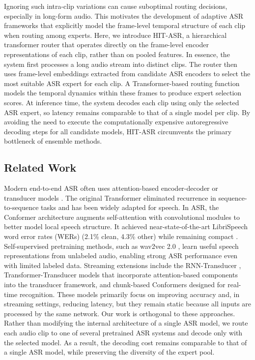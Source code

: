 \documentclass[journal]{IEEEtran}
\begin{document}
Ignoring such intra-clip variations can  cause suboptimal routing decisions, especially in long-form audio. This motivates the development of adaptive ASR frameworks that explicitly model the frame-level temporal structure of each clip when routing among experts. Here, we introduce HIT-ASR, a hierarchical transformer router that operates directly on the frame-level encoder representations of each clip, rather than on pooled features. In essence, the system first processes a long audio stream into distinct clips. The router then uses frame-level embeddings extracted from candidate ASR encoders to select the most suitable ASR expert for each clip. A Transformer-based routing function models the temporal dynamics within these frames to produce expert selection scores. At inference time, the system decodes each clip using only the selected ASR expert, so latency remains comparable to that of a single model per clip. By avoiding the need to execute the computationally expensive autoregressive decoding steps for all candidate models, HIT-ASR circumvents the primary bottleneck of ensemble methods.

 
\subsection{Related Work}
\label{sec:related_work}

Modern end-to-end ASR often uses attention-based encoder-decoder or transducer models \cite{deng_conf}. The original Transformer \cite{vaswani2017attention} eliminated recurrence in sequence-to-sequence tasks and has been widely adapted for speech. In ASR, the Conformer architecture \cite{gulati2020conformer} augments self-attention with convolutional modules to better model local speech structure. It achieved near-state-of-the-art LibriSpeech word error rates (WERs) (2.1\% clean, 4.3\% other) while remaining compact \cite{gulati2020conformer}. Self-supervised pretraining methods, such as wav2vec 2.0 \cite{baevski2020wav2vec}, learn useful speech representations from unlabeled audio, enabling strong ASR performance even with limited labeled data. Streaming extensions include the RNN-Transducer \cite{Graves2012SequenceTW}, Transformer-Transducer models that incorporate attention-based components into the transducer framework, and chunk-based Conformers designed for real-time recognition. These models primarily focus on improving accuracy and, in streaming settings, reducing latency, but they remain static because all inputs are processed by the same network. Our work is orthogonal to these approaches. Rather than modifying the internal architecture of a single ASR model, we route each audio clip to one of several pretrained ASR systems and decode only with the selected model. As a result, the decoding cost remains comparable to that of a single ASR model, while preserving the diversity of the expert pool.
\end{document}
